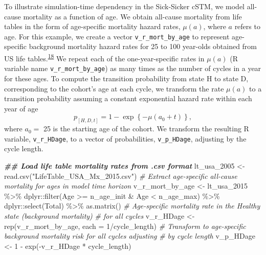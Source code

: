 \documentclass[
]{article}
\newenvironment{Shaded}{\begin{snugshade}}{\end{snugshade}}
\newcommand{\AttributeTok}[1]{\textcolor[rgb]{0.77,0.63,0.00}{#1}}
\newcommand{\CommentTok}[1]{\textcolor[rgb]{0.56,0.35,0.01}{\textit{#1}}}
\newcommand{\DecValTok}[1]{\textcolor[rgb]{0.00,0.00,0.81}{#1}}
\newcommand{\DocumentationTok}[1]{\textcolor[rgb]{0.56,0.35,0.01}{\textbf{\textit{#1}}}}
\newcommand{\FunctionTok}[1]{\textcolor[rgb]{0.00,0.00,0.00}{#1}}
\newcommand{\NormalTok}[1]{#1}
\newcommand{\OtherTok}[1]{\textcolor[rgb]{0.56,0.35,0.01}{#1}}
\newcommand{\SpecialCharTok}[1]{\textcolor[rgb]{0.00,0.00,0.00}{#1}}
\newcommand{\StringTok}[1]{\textcolor[rgb]{0.31,0.60,0.02}{#1}}
\begin{document}
To illustrate simulation-time dependency in the Sick-Sicker cSTM, we model all-cause mortality as a function of age. We obtain all-cause mortality from life tables in the form of age-specific mortality hazard rates, \(\mu(a)\), where \(a\) refers to age. For this example, we create a vector \texttt{v\_r\_mort\_by\_age} to represent age-specific background mortality hazard rates for 25 to 100 year-olds obtained from US life tables.\textsuperscript{\protect\hyperlink{ref-Arias2017}{18}} We repeat each of the one-year-specific rates in \(\mu(a)\) (R variable name \texttt{v\_r\_mort\_by\_age}) as many times as the number of cycles in a year for these ages. To compute the transition probability from state H to state D, corresponding to the cohort's age at each cycle, we transform the rate \(\mu(a)\) to a transition probability assuming a constant exponential hazard rate within each year of age
\[
  p_{[H,D,t]} = 1-\exp\left\{{-\mu(a_0 + t)}\right\},
\]
where \(a_0 =\) 25 is the starting age of the cohort. We transform the resulting R variable, \texttt{v\_r\_HDage}, to a vector of probabilities, \texttt{v\_p\_HDage}, adjusting by the cycle length.

\begin{Shaded}
\begin{Highlighting}[]
\DocumentationTok{\#\# Load life table mortality rates from \textasciigrave{}.csv\textasciigrave{} format}
\NormalTok{lt\_usa\_2005 }\OtherTok{\textless{}{-}} \FunctionTok{read.csv}\NormalTok{(}\StringTok{"LifeTable\_USA\_Mx\_2015.csv"}\NormalTok{)}
\CommentTok{\# Extract age{-}specific all{-}cause mortality for ages in model time horizon}
\NormalTok{v\_r\_mort\_by\_age }\OtherTok{\textless{}{-}}\NormalTok{ lt\_usa\_2015 }\SpecialCharTok{\%\textgreater{}\%} 
\NormalTok{  dplyr}\SpecialCharTok{::}\FunctionTok{filter}\NormalTok{(Age }\SpecialCharTok{\textgreater{}=}\NormalTok{ n\_age\_init }\SpecialCharTok{\&}\NormalTok{ Age }\SpecialCharTok{\textless{}}\NormalTok{ n\_age\_max) }\SpecialCharTok{\%\textgreater{}\%}
\NormalTok{  dplyr}\SpecialCharTok{::}\FunctionTok{select}\NormalTok{(Total) }\SpecialCharTok{\%\textgreater{}\%}
  \FunctionTok{as.matrix}\NormalTok{()}
\CommentTok{\# Age{-}specific mortality rate in the Healthy state (background mortality) }
\CommentTok{\# for all cycles}
\NormalTok{v\_r\_HDage  }\OtherTok{\textless{}{-}} \FunctionTok{rep}\NormalTok{(v\_r\_mort\_by\_age, }\AttributeTok{each =} \DecValTok{1}\SpecialCharTok{/}\NormalTok{cycle\_length)}
\CommentTok{\# Transform to age{-}specific background mortality risk for all cycles adjusting }
\CommentTok{\# by cycle length}
\NormalTok{v\_p\_HDage  }\OtherTok{\textless{}{-}} \DecValTok{1} \SpecialCharTok{{-}} \FunctionTok{exp}\NormalTok{(}\SpecialCharTok{{-}}\NormalTok{v\_r\_HDage }\SpecialCharTok{*}\NormalTok{ cycle\_length) }
\end{Highlighting}
\end{Shaded}
\end{document}

